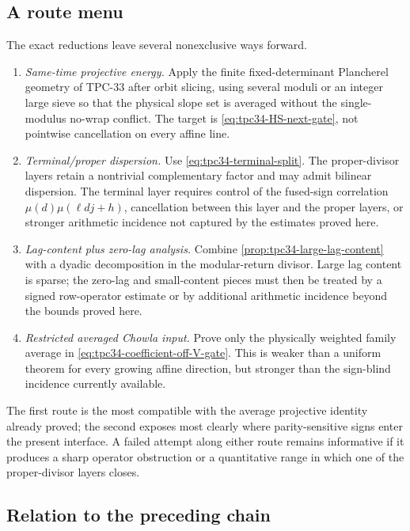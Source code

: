 \subsection{A route menu}

The exact reductions leave several nonexclusive ways forward.
\begin{enumerate}[label=\textup{Route \Alph*:},leftmargin=5.8em]
 \item \emph{Same-time projective energy.}  Apply the finite
 fixed-determinant Plancherel geometry of TPC-33 after orbit slicing,
 using several moduli or an integer large sieve so that the physical
 slope set is averaged without the single-modulus no-wrap conflict.
 The target is \eqref{eq:tpc34-HS-next-gate}, not pointwise cancellation
 on every affine line.

 \item \emph{Terminal/proper dispersion.}  Use
 \eqref{eq:tpc34-terminal-split}.  The proper-divisor layers retain a
 nontrivial complementary factor and may admit bilinear dispersion.
 The terminal layer requires control of the fused-sign correlation
 \(\mu(d)\mu(\ell dj+h)\), cancellation between this layer and the
 proper layers, or stronger arithmetic incidence not captured by the
 estimates proved here.

 \item \emph{Lag-content plus zero-lag analysis.}  Combine
 \cref{prop:tpc34-large-lag-content} with a dyadic decomposition in the
 modular-return divisor.  Large lag content is sparse; the zero-lag and
 small-content pieces must then be treated by a signed row-operator
 estimate or by additional arithmetic incidence beyond the bounds
 proved here.

 \item \emph{Restricted averaged Chowla input.}  Prove only the
 physically weighted family average in
 \eqref{eq:tpc34-coefficient-off-V-gate}.  This is weaker than a uniform
 theorem for every growing affine direction, but stronger than the
 sign-blind incidence currently available.
\end{enumerate}

The first route is the most compatible with the average projective
identity already proved; the second exposes most clearly where
parity-sensitive signs enter the present interface.  A failed attempt
along either route remains informative if it
produces a sharp operator obstruction or a quantitative range in which
one of the proper-divisor layers closes.

\subsection{Relation to the preceding chain}

